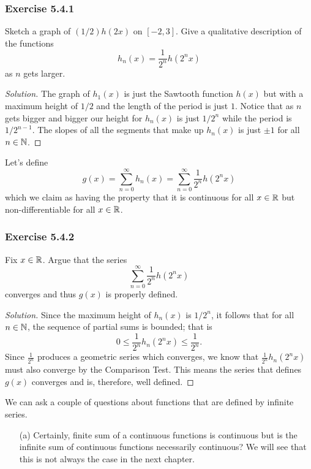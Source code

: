 
\subsubsection{Exercise 5.4.1} Sketch a graph of \( (1/2) h(2x)  \) on \( [-2,3]  \). Give a qualitative description of the functions 
\[  h_n(x) = \frac{ 1 }{ 2^n  } h(2^n x ) \]
as \( n  \) gets larger.
\begin{proof}[Solution]
    The graph of \( h_1(x)  \) is just the Sawtooth function \( h(x)  \) but with a maximum height of \( 1/2  \) and the length of the period is just \( 1  \). Notice that as \(  n \) gets bigger and bigger our height for \( h_n(x)  \) is just \( 1 / 2^n  \) while the period is \( 1 / 2^{n-1}  \). The slopes of all the segments that make up \( h_n(x)  \) is just \( \pm 1  \) for all \( n \in \mathbb{N}  \).
\end{proof}
Let's define 
\[  g(x) = \sum_{ n=0  }^{ \infty  } h_n(x) = \sum_{ n=0  }^{ \infty  } \frac{ 1 }{ 2^n  } h(2^n x ) \]
which we claim as having the property that it is continuous for all \( x \in \mathbb{R}  \) but non-differentiable for all \( x \in \mathbb{R}  \).

\subsubsection{Exercise 5.4.2} Fix \( x \in \mathbb{R}  \). Argue that the series 
\[  \sum_{ n=0  }^{ \infty  } \frac{ 1 }{ 2^n } h(2^n x) \]
converges and thus \( g(x)  \) is properly defined. 

\begin{proof}[Solution]
Since the maximum height of \( h_n(x)  \) is \( 1 / 2^n  \), it follows that for all \( n \in \mathbb{N}  \), the sequence of partial sums is bounded; that is
\[ 0 \leq \frac{ 1 }{ 2^n  } h_n(2^n x) \leq \frac{ 1 }{ 2^n  }.\]
Since \( \frac{ 1 }{ 2^n  }  \) produces a geometric series which converges, we know that \( \frac{ 1 }{ 2^n  } h_n (2^n x) \) must also converge by the Comparison Test. This means the series that defines \( g(x)  \) converges and is, therefore, well defined.
\end{proof}

We can ask a couple of questions about functions that are defined by infinite series. 
\begin{enumerate}
    \item[(a)] Certainly, finite sum of a continuous functions is continuous but is the infinite sum of continuous functions necessarily continuous? We will see that this is not always the case in the next chapter. 
\end{enumerate}

